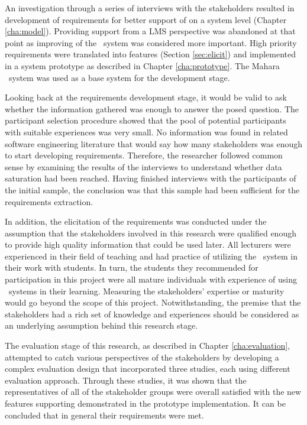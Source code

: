 
An investigation through a series of interviews with the stakeholders resulted
in development of requirements for better support of \LLLs on a system level
(Chapter \ref{cha:model}). Providing support from a LMS perspective was
abandoned at that point as improving of the \ep~system was considered more
important. High priority requirements were translated into features (Section
\ref{sec:elicit}) and implemented in a system prototype as described in Chapter
\ref{cha:prototype}. The Mahara \ep~system was used as a base system for the
development stage.

Looking back at the requirements development stage, it would be valid to ask
whether the information gathered was enough to answer the posed question.
The participant selection procedure showed that the pool of potential
participants with suitable experiences was very small. No information was found
in related software engineering literature that would say how many stakeholders
was enough to start developing requirements. Therefore, the researcher followed
common sense by examining the results of the interviews to understand whether
data saturation had been reached. Having finished interviews with the
participants of the initial sample, the conclusion was that this sample had been
sufficient for the requirements extraction.

In addition, the elicitation of the requirements was conducted under the
assumption that the stakeholders involved in this research were qualified enough
to provide high quality information that could be used later. All lecturers were
experienced in their field of teaching and had practice of utilizing the
\ep~system in their work with students. In turn, the students they recommended
for participation in this project were all mature individuals with experience of
using \ep~systems in their learning. Measuring the stakeholders' expertise or
maturity would go beyond the scope of this project. Notwithstanding, the premise
that the stakeholders had a rich set of knowledge and experiences should be
considered as an underlying assumption behind this research stage.


The evaluation stage of this research, as described in Chapter
\ref{cha:evaluation}, attempted to catch various perspectives of the stakeholders by developing a
complex evaluation design that incorporated three studies, each using different
evaluation approach. Through these studies, it was shown that the
representatives of all of the stakeholder groups were overall satisfied with the
new features supporting \LLLs demonstrated in the prototype implementation. It
can be concluded that in general their requirements were met.


